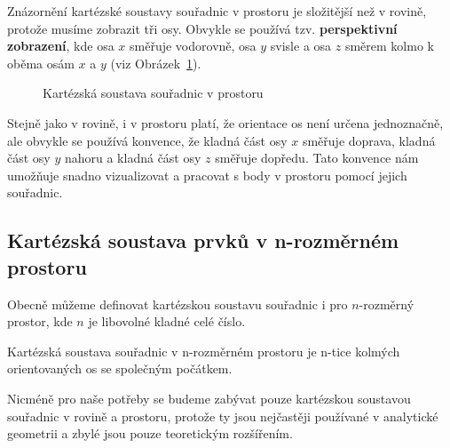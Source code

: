 Znázornění kartézské soustavy souřadnic v prostoru je složitější než v rovině, protože musíme zobrazit tři osy.
Obvykle se používá tzv. \textbf{perspektivní zobrazení}, kde osa $x$ směřuje vodorovně, osa $y$ svisle a osa $z$ směrem kolmo k oběma osám $x$ a $y$ (viz Obrázek~\ref{fig:cartesian_space}).

\begin{figure}[h!] 
    \centering
    \caption{Kartézská soustava souřadnic v prostoru}
    \label{fig:cartesian_space}
\end{figure}

\begin{remark}
    Stejně jako v rovině, i v prostoru platí, že orientace os není určena jednoznačně, ale obvykle se používá konvence, že kladná část osy $x$ směřuje doprava, kladná část osy $y$ nahoru a kladná část osy $z$ směřuje dopředu. 
    Tato konvence nám umožňuje snadno vizualizovat a pracovat s body v prostoru pomocí jejich souřadnic.
\end{remark}


\subsection{Kartézská soustava prvků v n-rozměrném prostoru}\label{subsec:Cartesian_coordinate_system_n}
Obecně můžeme definovat kartézskou soustavu souřadnic i pro $n$-rozměrný prostor, kde $n$ je libovolné kladné celé číslo.
\begin{definition}\label{def:karteska_soustava_n}
    Kartézská soustava souřadnic v n-rozměrném prostoru je n-tice kolmých orientovaných os se společným počátkem.
\end{definition}

Nicméně pro naše potřeby se budeme zabývat pouze kartézskou soustavou souřadnic v rovině a prostoru, protože ty jsou nejčastěji používané v analytické geometrii a zbylé jsou pouze teoretickým rozšířením.







